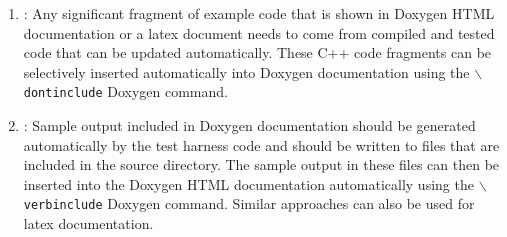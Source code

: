 \begin{enumerate}
{\begin{verbatim}
    //@}

    ...

  };

\end{verbatim}}

{}\item\DOXAutogenerateExampleCode: Any significant fragment of example code
that is shown in Doxygen HTML documentation or a latex document needs to come
from compiled and tested code that can be updated automatically.  These C++
code fragments can be selectively inserted automatically into Doxygen
documentation using the {}\texttt{$\backslash$dontinclude} Doxygen command.

{}\item\DOXAutogenerateSampleOutput: Sample output included in Doxygen
documentation should be generated automatically by the test harness code and
should be written to files that are included in the source directory.  The
sample output in these files can then be inserted into the Doxygen HTML
documentation automatically using the {}\texttt{$\backslash$verbinclude}
Doxygen command.  Similar approaches can also be used for latex documentation.

\end{enumerate}
